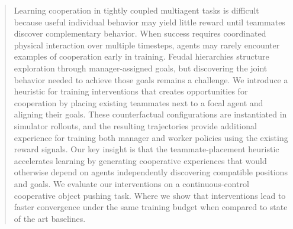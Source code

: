 \begin{abstract}
Learning cooperation in tightly coupled multiagent tasks is difficult because
useful individual behavior may yield little reward until teammates discover
complementary behavior. When success requires coordinated physical interaction
over multiple timesteps, agents may rarely encounter examples of cooperation
early in training. Feudal hierarchies structure exploration through
manager-assigned goals, but discovering the joint behavior needed to achieve
those goals remains a challenge. We introduce a heuristic for training interventions that creates opportunities for cooperation by placing existing teammates next to a focal agent and aligning their goals. These counterfactual configurations are instantiated in simulator
rollouts, and the resulting trajectories provide additional experience for
training both manager and worker policies using the existing reward signals. Our key insight is that the teammate-placement heuristic accelerates learning by generating cooperative experiences that would
otherwise depend on agents independently discovering compatible positions and goals. We evaluate our interventions on a continuous-control cooperative object pushing task. Where we show that interventions lead to faster convergence under the same training budget when compared to state of the art baselines.
\end{abstract}
